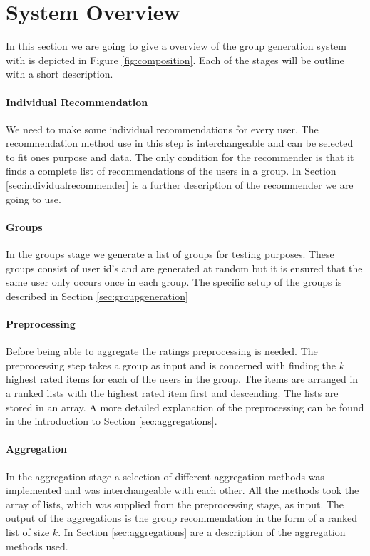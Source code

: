 \section{System Overview}\label{sec:systemoverview}
In this section we are going to give a overview of the group generation system with is depicted in Figure \ref{fig:composition}. Each of the stages will be outline with a short description. 

\paragraph{Individual Recommendation} We need to make some individual recommendations for every user. The recommendation method use in this step is interchangeable and can be selected to fit ones purpose and data. The only condition for the recommender is that it finds a complete list of recommendations of the users in a group. In Section \ref{sec:individualrecommender} is a further description of the recommender we are going to use.

\paragraph{Groups} In the groups stage we generate a list of groups for testing purposes. These groups consist of user id's and are generated at random but it is ensured that the same user only occurs once in each group. The specific setup of the groups is described in Section \ref{sec:groupgeneration}

\paragraph{Preprocessing} Before being able to aggregate the ratings preprocessing is needed. The preprocessing step takes a group as input and is concerned with finding the $k$ highest rated items for each of the users in the group. The items are arranged in a ranked lists with the highest rated item first and descending. The lists are stored in an array. A more detailed explanation of the preprocessing can be found in the introduction to Section \ref{sec:aggregations}.

\paragraph{Aggregation} In the aggregation stage a selection of different aggregation methods was implemented and was interchangeable with each other. All the methods took the array of lists, which was supplied from the preprocessing stage, as input. The output of the aggregations is the group recommendation in the form of a ranked list of size $k$. In Section \ref{sec:aggregations} are a description of the aggregation methods used. 


